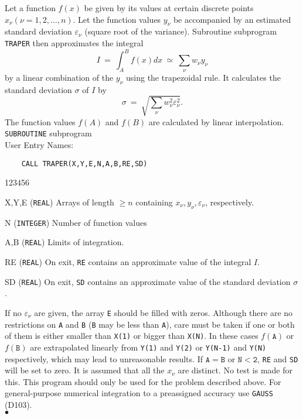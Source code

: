                                
                        
\Submitter{}                                  
Let a function $f(x)$ be given by its values at certain discrete points
$x_\nu (\nu =1,2,\ldots,n)$.
Let the function values $y_\nu$ be accompanied by an estimated
standard deviation $\varepsilon_\nu$ (square root of the variance).
Subroutine subprogram {\tt TRAPER} then approximates the integral
$$ I \ = \ \displaystyle \int_A^B f(x)dx \ \simeq \
\sum_\nu w_\nu y_\nu $$
by a linear combination of the $y_\nu$ using the trapezoidal rule.
It calculates the standard deviation $\sigma$ of $I$ by
$$ \sigma \ = \ \sqrt{\sum_\nu w_\nu^2\varepsilon_\nu^2}.$$
The function values  $f(A)$ and  $f(B)$ are
calculated by linear interpolation.
\Structure
{\tt SUBROUTINE} subprogram  \\
User Entry Names: 
\Usage
\begin{verbatim}
    CALL TRAPER(X,Y,E,N,A,B,RE,SD)
\end{verbatim}
\begin{DLtt}{123456}
\item[X,Y,E] ({\tt REAL}) Arrays of length $\geq n $ containing
$ x_\nu,y_\nu,\varepsilon_\nu $, respectively.
\item[N]({\tt INTEGER}) Number of function values
\item[A,B]({\tt REAL})  Limits of integration.
\item[RE]({\tt REAL}) On exit, {\tt RE} contains an approximate value
of the integral $I$.
\item[SD]({\tt REAL}) On exit, {\tt SD} contains an approximate value of
the standard deviation $\sigma$.
\end{DLtt}
If no $\varepsilon_\nu$ are given, the array {\tt E} should be
filled with zeros.
\Restrict
Although there are no restrictions on {\tt A} and {\tt B}
({\tt B} may be less than {\tt A}), care must be taken if one or
both of them is either smaller than {\tt X(1)} or bigger than {\tt X(N)}.
In these cases $f(\mathtt{A})$ or $f(\mathtt{B})$ are extrapolated
linearly
from {\tt Y(1)} and {\tt Y(2)} or {\tt Y(N-1)} and {\tt Y(N)}
respectively, which may lead to unreasonable results.
If $\mathtt{A = B}$ or $\mathtt{N < 2}$, {\tt RE} and {\tt SD}
will be set to zero. It is assumed that all the $x_\nu$ are distinct.
No test is made for this.
\Notes
This program should only be used for the problem
described above. For general-purpose numerical integration to a
preassigned accuracy use {\tt GAUSS} (D103).
\\ $\bullet$
